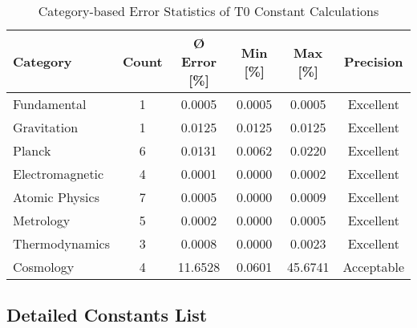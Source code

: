 \documentclass[11pt,a4paper]{article}
\begin{document}
	\begin{table}[h]
		\centering
		\begin{tabular}{>{\raggedright}p{4cm}ccccc}
			\toprule
			\textbf{Category} & \textbf{Count} & \textbf{Ø Error [\%]} & \textbf{Min [\%]} & \textbf{Max [\%]} & \textbf{Precision} \\
			\midrule
			Fundamental & 1 & 0.0005 & 0.0005 & 0.0005 & Excellent \\
			Gravitation & 1 & 0.0125 & 0.0125 & 0.0125 & Excellent \\
			Planck & 6 & 0.0131 & 0.0062 & 0.0220 & Excellent \\
			Electromagnetic & 4 & 0.0001 & 0.0000 & 0.0002 & Excellent \\
			Atomic Physics & 7 & 0.0005 & 0.0000 & 0.0009 & Excellent \\
			Metrology & 5 & 0.0002 & 0.0000 & 0.0005 & Excellent \\
			Thermodynamics & 3 & 0.0008 & 0.0000 & 0.0023 & Excellent \\
			Cosmology & 4 & 11.6528 & 0.0601 & 45.6741 & Acceptable \\
			\bottomrule
		\end{tabular}
		\caption{Category-based Error Statistics of T0 Constant Calculations}
	\end{table}
	
	\subsection{Detailed Constants List}
	
\end{document}
